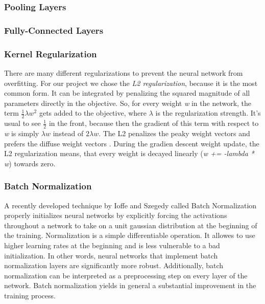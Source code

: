 \documentclass[journal]{IEEEtran}
\begin{document}
\subsubsection{Pooling Layers}
\subsubsection{Fully-Connected Layers}
\subsubsection{Kernel Regularization}
There are many different regularizations to prevent the neural network from overfitting. For our project we chose the \textit{L2 regularization}, because it is the most common form.
It can be integrated by penalizing the squared magnitude of all parameters directly in the objective. So, for every weight \textit{w} in the network, the term \(\frac{1}{2} \lambda w^2\) gets added to the objective, where \(\lambda \) is the regularization strength. It's usual to see \(\frac{1}{2}\) in the front, because then the gradient of this term with respect to \textit{w} is simply \(\lambda w\) instead of \(2 \lambda w\). The L2 penalizes the peaky weight vectors and prefers the diffuse weight vectors \cite{RN4}. During the gradien descent weight update, the L2 regularization means, that every weight is decayed linearly (\textit{w += -lambda * w}) towards zero. \\
\subsubsection{Batch Normalization}
A recently developed technique by Ioffe and Szegedy \cite{RN4} called Batch Normalization  properly initializes neural networks by explicitly forcing the activations throughout a network to take on a unit gaussian distribution at the beginning of the training. Normalization is a simple differentiable operation. 
It allowes to use higher learning rates at the beginning and is less vulnerable to a bad initialization. In other words, neural networks that implement batch normalization layers are significantly more robust. Additionally, batch normalization can be interpreted as a preprocessing step on every layer of the network. Batch normalization yields in general a substantial improvement in the training process. \\
\end{document}
